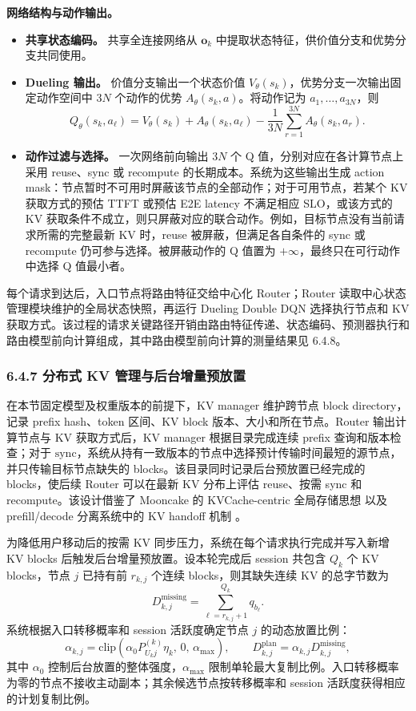\textbf{网络结构与动作输出。}
\begin{itemize}
    \item \textbf{共享状态编码。} 共享全连接网络从 \(\mathbf o_k\) 中提取状态特征，供价值分支和优势分支共同使用。
    \item \textbf{Dueling 输出。} 价值分支输出一个状态价值 \(V_\theta(s_k)\)，优势分支一次输出固定动作空间中 \(3N\) 个动作的优势 \(A_\theta(s_k,a)\)。将动作记为 \(a_1,\ldots,a_{3N}\)，则
    \[
    Q_\theta(s_k,a_\ell)
    =
    V_\theta(s_k)+A_\theta(s_k,a_\ell)
    -\frac{1}{3N}\sum_{r=1}^{3N}A_\theta(s_k,a_r).
    \]
    \item \textbf{动作过滤与选择。} 一次网络前向输出 \(3N\) 个 Q 值，分别对应在各计算节点上采用 reuse、sync 或 recompute 的长期成本。系统为这些输出生成 action mask：节点暂时不可用时屏蔽该节点的全部动作；对于可用节点，若某个 KV 获取方式的预估 TTFT 或预估 E2E latency 不满足相应 SLO，或该方式的 KV 获取条件不成立，则只屏蔽对应的联合动作。例如，目标节点没有当前请求所需的完整最新 KV 时，reuse 被屏蔽，但满足各自条件的 sync 或 recompute 仍可参与选择。被屏蔽动作的 Q 值置为 \(+\infty\)，最终只在可行动作中选择 Q 值最小者。
\end{itemize}

每个请求到达后，入口节点将路由特征交给中心化 Router；Router 读取中心状态管理模块维护的全局状态快照，再运行 Dueling Double DQN 选择执行节点和 KV 获取方式。该过程的请求关键路径开销由路由特征传递、状态编码、预测器执行和路由模型前向计算组成，其中路由模型前向计算的测量结果见 6.4.8。

\subsubsection*{6.4.7 分布式 KV 管理与后台增量预放置}

在本节固定模型及权重版本的前提下，KV manager 维护跨节点 block directory，记录 prefix hash、token 区间、KV block 版本、大小和所在节点。Router 输出计算节点与 KV 获取方式后，KV manager 根据目录完成连续 prefix 查询和版本检查；对于 \(\mathrm{sync}\)，系统从持有一致版本的节点中选择预计传输时间最短的源节点，并只传输目标节点缺失的 blocks。该目录同时记录后台预放置已经完成的 blocks，使后续 Router 可以在最新 KV 分布上评估 reuse、按需 sync 和 recompute。该设计借鉴了 Mooncake 的 KVCache-centric 全局存储思想 \cite{qin2025mooncake} 以及 prefill/decode 分离系统中的 KV handoff 机制 \cite{zhong2024distserve}。

为降低用户移动后的按需 KV 同步压力，系统在每个请求执行完成并写入新增 KV blocks 后触发后台增量预放置。设本轮完成后 session 共包含 \(Q_k\) 个 KV blocks，节点 \(j\) 已持有前 \(r_{k,j}\) 个连续 blocks，则其缺失连续 KV 的总字节数为
\[
D_{k,j}^{\mathrm{missing}}
=
\sum_{\ell=r_{k,j}+1}^{Q_k}q_{b_\ell}.
\]
系统根据入口转移概率和 session 活跃度确定节点 \(j\) 的动态放置比例：
\[
\alpha_{k,j}
=
\mathrm{clip}
\left(
\alpha_0 P_{U_kj}^{(k)}\eta_k,\,
0,\,
\alpha_{\max}
\right),
\qquad
D_{k,j}^{\mathrm{plan}}
=
\alpha_{k,j}D_{k,j}^{\mathrm{missing}},
\]
其中 \(\alpha_0\) 控制后台放置的整体强度，\(\alpha_{\max}\) 限制单轮最大复制比例。入口转移概率为零的节点不接收主动副本；其余候选节点按转移概率和 session 活跃度获得相应的计划复制比例。

